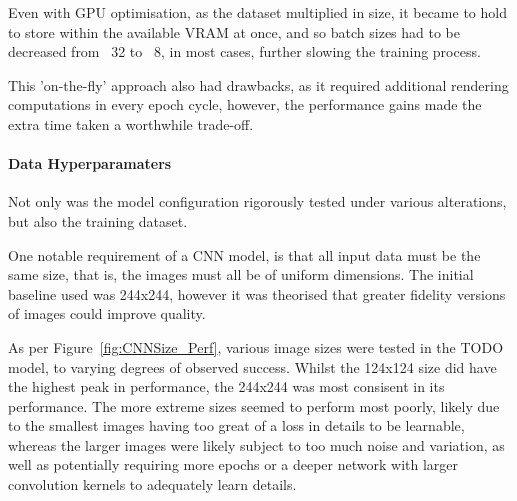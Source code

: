                         Even with GPU optimisation, as the dataset multiplied in size, it became to hold to store within the available VRAM at once, and so batch sizes had to be decreased from ~32 to ~8, in most cases, further slowing the training process.
    
                        This 'on-the-fly' approach also had drawbacks, as it required additional rendering computations in every epoch cycle, however, the performance gains made the extra time taken a worthwhile trade-off.
        
                    \paragraph{Data Hyperparamaters}
    
                        Not only was the model configuration rigorously tested under various alterations, but also the training dataset.
    
                        One notable requirement of a CNN model, is that all input data must be the same size, that is, the images must all be of uniform dimensions. The initial baseline used was 244x244, however it was theorised that greater fidelity versions of images could improve quality.
    
                        As per Figure~\ref{fig:CNNSize_Perf}, various image sizes were tested in the TODO model, to varying degrees of observed success. Whilst the 124x124 size did have the highest peak in performance, the 244x244 was most consisent in its performance. The more extreme sizes seemed to perform most poorly, likely due to the smallest images having too great of a loss in details to be learnable, whereas the larger images were likely subject to too much noise and variation, as well as potentially requiring more epochs or a deeper network with larger convolution kernels to adequately learn details.
            
